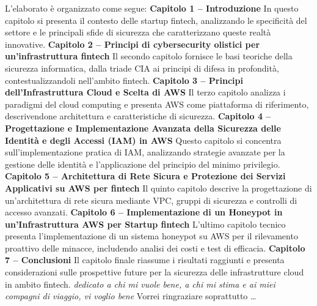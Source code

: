 \documentclass[a4paper,12pt]{report}
\begin{document}
L'elaborato è organizzato come segue:
\newline
\newline
\textbf{Capitolo 1 – Introduzione} In questo capitolo si presenta il contesto delle 
startup fintech, analizzando le specificità del settore e le principali sfide 
di sicurezza che caratterizzano queste realtà innovative.
\newline
\newline
\textbf{Capitolo 2 – Principi di cybersecurity olistici per un'infrastruttura fintech} 
Il secondo capitolo fornisce le basi teoriche della sicurezza informatica, 
dalla triade CIA ai principi di difesa in profondità, contestualizzandoli 
nell'ambito fintech.
\newline
\newline
\textbf{Capitolo 3 – Principi dell'Infrastruttura Cloud e Scelta di AWS} Il terzo 
capitolo analizza i paradigmi del cloud computing e presenta AWS come 
piattaforma di riferimento, descrivendone architettura e caratteristiche 
di sicurezza.
\newline
\newline
\textbf{Capitolo 4 – Progettazione e Implementazione Avanzata della Sicurezza delle 
Identità e degli Accessi (IAM) in AWS} Questo capitolo si concentra sull'implementazione 
pratica di IAM, analizzando strategie avanzate per la gestione delle identità 
e l'applicazione del principio del minimo privilegio.
\newline
\newline
\textbf{Capitolo 5 – Architettura di Rete Sicura e Protezione dei Servizi Applicativi 
su AWS per fintech} Il quinto capitolo descrive la progettazione di un'architettura 
di rete sicura mediante VPC, gruppi di sicurezza e controlli di accesso avanzati.
\newline
\newline
\textbf{Capitolo 6 – Implementazione di un Honeypot in un'Infrastruttura AWS per 
Startup fintech} L'ultimo capitolo tecnico presenta l'implementazione di un 
sistema honeypot su AWS per il rilevamento proattivo delle minacce, includendo 
analisi dei costi e test di efficacia.
\newline
\newline
\textbf{Capitolo 7 – Conclusioni} Il capitolo finale riassume i risultati raggiunti 
e presenta considerazioni sulle prospettive future per la sicurezza delle 
infrastrutture cloud in ambito fintech.
{\hfill \Large {\sl dedicato a chi mi vuole bene, a chi mi stima e ai miei compagni di viaggio, vi voglio bene}}
        Vorrei ringraziare soprattutto \dots
\end{document}

